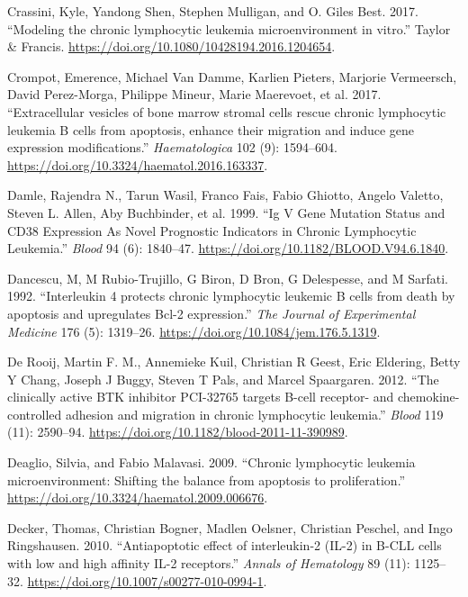 \documentclass[11pt, a4paper, twosided]{book}
\newenvironment{CSLReferences}%
  {}%
  {\par}
\begin{document}
\begin{CSLReferences}{1}{0}
\leavevmode{}%
Crassini, Kyle, Yandong Shen, Stephen Mulligan, and O. Giles Best. 2017. {``{Modeling the chronic lymphocytic leukemia microenvironment in vitro}.''} Taylor \& Francis. \url{https://doi.org/10.1080/10428194.2016.1204654}.

\leavevmode{}%
Crompot, Emerence, Michael Van Damme, Karlien Pieters, Marjorie Vermeersch, David Perez-Morga, Philippe Mineur, Marie Maerevoet, et al. 2017. {``{Extracellular vesicles of bone marrow stromal cells rescue chronic lymphocytic leukemia B cells from apoptosis, enhance their migration and induce gene expression modifications}.''} \emph{Haematologica} 102 (9): 1594--604. \url{https://doi.org/10.3324/haematol.2016.163337}.

\leavevmode{}%
Damle, Rajendra N., Tarun Wasil, Franco Fais, Fabio Ghiotto, Angelo Valetto, Steven L. Allen, Aby Buchbinder, et al. 1999. {``{Ig V Gene Mutation Status and CD38 Expression As Novel Prognostic Indicators in Chronic Lymphocytic Leukemia}.''} \emph{Blood} 94 (6): 1840--47. \url{https://doi.org/10.1182/BLOOD.V94.6.1840}.

\leavevmode{}%
Dancescu, M, M Rubio-Trujillo, G Biron, D Bron, G Delespesse, and M Sarfati. 1992. {``{Interleukin 4 protects chronic lymphocytic leukemic B cells from death by apoptosis and upregulates Bcl-2 expression.}''} \emph{The Journal of Experimental Medicine} 176 (5): 1319--26. \url{https://doi.org/10.1084/jem.176.5.1319}.

\leavevmode{}%
De Rooij, Martin F. M., Annemieke Kuil, Christian R Geest, Eric Eldering, Betty Y Chang, Joseph J Buggy, Steven T Pals, and Marcel Spaargaren. 2012. {``{The clinically active BTK inhibitor PCI-32765 targets B-cell receptor- and chemokine-controlled adhesion and migration in chronic lymphocytic leukemia}.''} \emph{Blood} 119 (11): 2590--94. \url{https://doi.org/10.1182/blood-2011-11-390989}.

\leavevmode{}%
Deaglio, Silvia, and Fabio Malavasi. 2009. {``{Chronic lymphocytic leukemia microenvironment: Shifting the balance from apoptosis to proliferation}.''} \url{https://doi.org/10.3324/haematol.2009.006676}.

\leavevmode{}%
Decker, Thomas, Christian Bogner, Madlen Oelsner, Christian Peschel, and Ingo Ringshausen. 2010. {``{Antiapoptotic effect of interleukin-2 (IL-2) in B-CLL cells with low and high affinity IL-2 receptors}.''} \emph{Annals of Hematology} 89 (11): 1125--32. \url{https://doi.org/10.1007/s00277-010-0994-1}.


\end{CSLReferences}
\end{document}
